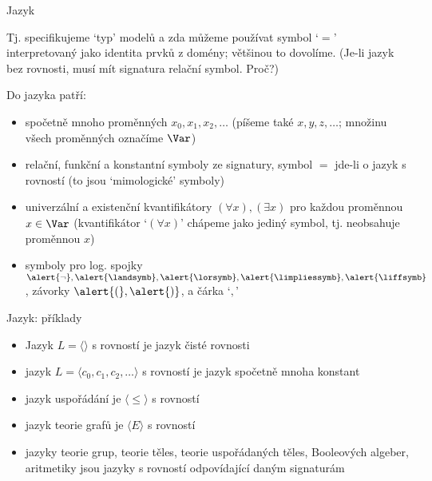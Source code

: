\documentclass{beamer}
\begin{document}
\begin{frame}{Jazyk}


    Tj. specifikujeme `typ' modelů a zda můžeme používat symbol `\alert{$=$}' interpretovaný jako \alert{identita} prvků z domény; většinou to dovolíme.  \pause (Je-li jazyk bez  rovnosti, musí mít signatura relační symbol. Proč?) \pause 
    
    Do jazyka patří: \pause 
    \begin{itemize}
        \item spočetně mnoho \alert{proměnných} $x_0,x_1,x_2,\dots$ (píšeme také $x,y,z,\dots$; množinu všech proměnných označíme \alert{$\Var$}) \pause 
        \item \alert{relační}, \alert{funkční} a \alert{konstantní symboly} ze signatury, symbol \alert{$=$} jde-li o jazyk s rovností (to jsou `\alert{mimologické}' symboly) \pause 
        \item \alert{univerzální} a \alert{existenční} \alert{kvantifikátory} $(\forall x),(\exists x)$ pro každou proměnnou $x\in\Var$ \pause (kvantifikátor `$(\forall x)$' chápeme jako jediný symbol, tj. \alert{neobsahuje} proměnnou $x$) \pause 
        \item symboly pro log. spojky \( \alert{\neg},\alert{\landsymb},\alert{\lorsymb}, \alert{\limpliessymb}, \alert{\liffsymb} \), závorky \( \alert{(},\alert{)} \), a čárka `\alert{$,$}'
    \end{itemize}

\end{frame}


\begin{frame}{Jazyk: příklady}

    
    \begin{itemize}
        \item Jazyk \alert{$L=\langle\rangle$ s rovností} je jazyk \alert{čisté rovnosti} \pause 
        \item jazyk $L=\langle c_0,c_1,c_2,\dots\rangle$ s rovností je jazyk \alert{spočetně mnoha konstant} \pause 
        \item jazyk \alert{uspořádání} je $\langle \leq \rangle$ s rovností \pause 
        \item jazyk \alert{teorie grafů} je $\langle E \rangle$ s rovností \pause 
        \item jazyky \alert{teorie grup, teorie těles, teorie uspořádaných těles, Booleových algeber, aritmetiky} jsou jazyky \alert{s rovností} odpovídající daným signaturám
    \end{itemize}
    
\end{frame}
\end{document}
